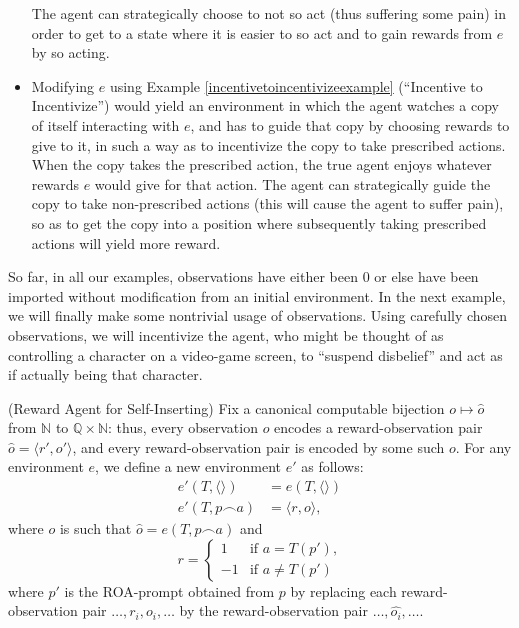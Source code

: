 \documentclass[runningheads]{llncs}
\begin{document}
\begin{example}
\begin{itemize}
        The agent can strategically choose to not so act (thus suffering some
        pain) in order to get to a state where it is easier to so act and
        to gain rewards from $e$ by so acting.
        \item
        Modifying $e$ using Example \ref{incentivetoincentivizeexample}
        (``Incentive to Incentivize'') would yield an environment in which
        the agent watches a copy of itself interacting with $e$, and has to
        guide that copy by choosing rewards to give to it, in such a
        way as to incentivize the copy to take prescribed actions. When the copy
        takes the prescribed action, the true agent enjoys whatever rewards
        $e$ would give for that action. The agent can strategically guide the
        copy to take non-prescribed actions (this will cause the agent to suffer
        pain), so as to get the copy into a position where subsequently taking
        prescribed actions will yield more reward.
    \end{itemize}
\end{example}

So far, in all our examples, observations have either been $0$ or else have been
imported without modification from an initial environment. In the next example,
we will finally make some nontrivial usage of observations. Using carefully chosen
observations, we will incentivize the agent, who might be thought of as
controlling a character on a video-game screen,
to ``suspend disbelief'' and act as if actually being that character.

\begin{example}
\label{selfinsertionexample}
    (Reward Agent for Self-Inserting)
    Fix a canonical computable bijection
    $o\mapsto \hat o$
    from $\mathbb N$ to $\mathbb Q\times \mathbb N$:
    thus, every observation $o$ encodes a reward-observation pair
    $\hat o = \langle r',o'\rangle$, and every reward-observation pair
    is encoded by some such $o$.
    For any environment $e$, we define
    a new environment $e'$ as follows:
    \begin{align*}
        e'(T,\langle\rangle) &= e(T,\langle\rangle)\\
        e'(T,p\frown a) &= \langle r,o\rangle,
    \end{align*}
    where $o$ is such that $\hat o = e(T,p\frown a)$ and
    \[
        r =
        \begin{cases}
            1 & \mbox{if $a=T(p')$,}\\
            -1 & \mbox{if $a\not=T(p')$}
        \end{cases}
    \]
    where
    $p'$ is the ROA-prompt obtained from $p$
    by replacing each reward-observation pair
    $\ldots,r_i,o_i,\ldots$ by the reward-observation
    pair $\ldots,\widehat{o_i},\ldots$.
\end{example}
\end{document}
